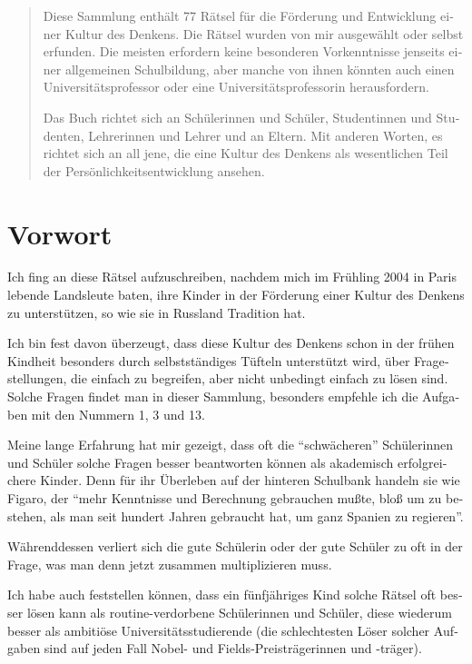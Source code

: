 
\setdefaultlanguage{german}
\DeclareSIUnit[number-unit-product=\,]
\DeclareSIUnit[number-unit-product=\,]




\begin{abstract}
Diese Sammlung enthält 77 Rätsel für die Förderung und Entwicklung einer Kultur des Denkens. Die Rätsel wurden von mir ausgewählt oder selbst erfunden. Die meisten erfordern keine besonderen Vorkenntnisse jenseits einer allgemeinen Schulbildung, aber manche von ihnen könnten auch einen Universitätsprofessor oder eine Uni\-ver\-si\-täts\-pro\-fes\-sorin herausfordern. 

	Das Buch richtet sich an Schülerinnen und Schüler, Studentinnen und Studenten, Lehrerinnen und Lehrer und an Eltern. Mit anderen Worten, es richtet sich an all jene, die eine Kultur des Denkens als wesentlichen Teil der Persönlichkeitsentwicklung ansehen.
\end{abstract}
\clearpage

\section*{Vorwort}
	Ich fing an diese Rätsel aufzuschreiben, nachdem mich im Frühling 2004 in Paris lebende Landsleute baten, ihre Kinder in der Förderung einer Kultur des Denkens zu unterstützen, so wie sie in Russland Tradition hat.

	Ich bin fest davon überzeugt, dass diese Kultur des Denkens schon in der frühen Kindheit besonders durch selbstständiges Tüfteln unterstützt wird, über Fragestellungen, die einfach zu begreifen, aber nicht unbedingt einfach zu lösen sind. Solche Fragen findet man in dieser Sammlung, besonders empfehle ich die Aufgaben mit den Nummern 1, 3 und 13.

	Meine lange Erfahrung hat mir gezeigt, dass oft die \enquote{schwächeren} Schü\-le\-rin\-nen und Schüler solche Fragen besser beantworten können als akademisch erfolgreichere Kinder. Denn für ihr Überleben auf der hinteren Schulbank handeln sie wie Figaro, der \enquote{mehr Kenntnisse und Berechnung gebrauchen mußte, bloß um zu bestehen, als man seit hundert Jahren gebraucht hat, um ganz Spanien zu regieren}.

	Währenddessen verliert sich die gute Schülerin oder der gute Schüler zu oft in der Frage, was man denn jetzt zusammen multiplizieren muss. 

	Ich habe auch feststellen können, dass ein fünfjähriges Kind solche Rätsel oft besser lösen kann als routine-verdorbene Schülerinnen und Schüler, diese wiederum besser als ambitiöse Universitätsstudierende (die schlechtesten Löser solcher Aufgaben sind auf jeden Fall Nobel- und Fields-Preisträgerinnen und -träger).

